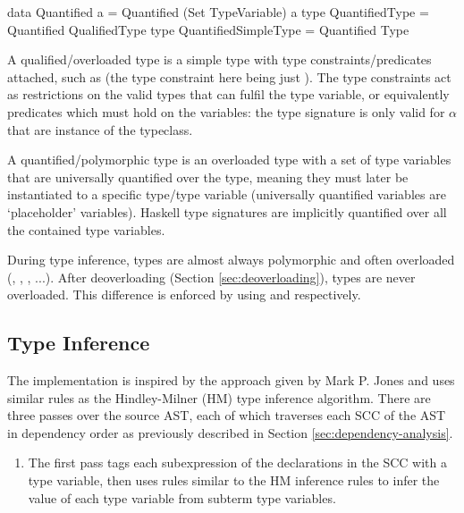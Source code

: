 \documentclass[dissertation.tex]{subfiles}
\begin{document}
{{\begin{haskellfigure}
        data Quantified a = Quantified (Set TypeVariable) a
        type QuantifiedType = Quantified QualifiedType
        type QuantifiedSimpleType = Quantified Type
        \end{haskellfigure}

        A qualified/overloaded type is a simple type with type constraints/predicates attached, such as  (the type constraint here being just ). The type constraints act as restrictions on the valid types that can fulfil the type variable, or equivalently predicates which must hold on the variables: the type signature is only valid for \(\alpha\) that are instance of the  typeclass. 

        A quantified/polymorphic type is an overloaded type with a set of type variables that are universally quantified over the type, meaning they must later be instantiated to a specific type/type variable (universally quantified variables are `placeholder' variables). Haskell type signatures are implicitly quantified over all the contained type variables.

        During type inference, types are almost always polymorphic and often overloaded (, , , ...). After deoverloading (Section \ref{sec:deoverloading}), types are never overloaded. This difference is enforced by using  and  respectively.
    }
    \subsection{Type Inference}
    {
        The implementation is inspired by the approach given by Mark P. Jones\cite{THIH} and uses similar rules as the Hindley-Milner (HM) type inference algorithm. There are three passes over the source AST, each of which traverses each SCC of the AST in dependency order as previously described in Section \ref{sec:dependency-analysis}.

        \begin{enumerate}
        \item
        {
            The first pass tags each subexpression of the declarations in the SCC with a type variable, then uses rules similar to the HM inference rules to infer the value of each type variable from subterm type variables.
            
}
\end{enumerate}}}
\end{document}
